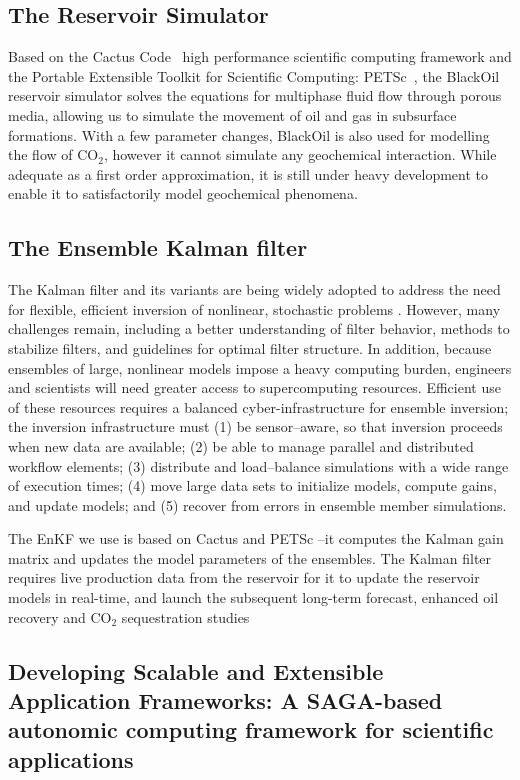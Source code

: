 \documentclass{acm_proc_article-sp}
\begin{document}
\subsection{The Reservoir Simulator} 

Based on the Cactus Code~\cite{cactus_web} high performance
scientific computing framework and the Portable Extensible Toolkit for
Scientific Computing: PETSc~\cite{PETSc}, the BlackOil reservoir
simulator solves the equations for multiphase fluid flow through
porous media, allowing us to simulate the movement of oil and gas in
subsurface formations. With a few parameter changes, BlackOil is also
used for modelling the flow of CO$_2$, however it cannot simulate any
geochemical interaction. While adequate as a first order
approximation, it is still under heavy development to enable it to
satisfactorily model geochemical phenomena.

\subsection{The Ensemble Kalman filter} 

The Kalman filter and its variants are being widely adopted to address
the need for flexible, efficient inversion of nonlinear, stochastic
problems \cite{DataAssim}. However, many challenges remain,
including a better understanding of filter behavior, methods to
stabilize filters, and guidelines for optimal filter structure. In
addition, because ensembles of large, nonlinear models impose a heavy
computing burden, engineers and scientists will need greater access to
supercomputing resources. Efficient use of these resources requires a
balanced cyber-infrastructure for ensemble inversion; the inversion
infrastructure must (1) be sensor--aware, so that inversion proceeds
when new data are available; (2) be able to manage parallel and
distributed workflow elements; (3) distribute and load--balance
simulations with a wide range of execution times; (4) move large data
sets to initialize models, compute gains, and update models; and (5)
recover from errors in ensemble member simulations.

The EnKF we use is based on Cactus and PETSc --it computes the Kalman
gain matrix and updates the model parameters of the ensembles. The
Kalman filter requires live production data from the reservoir for it
to update the reservoir models in real-time, and launch the subsequent
long-term forecast, enhanced oil recovery and CO$_2$ sequestration
studies

\subsection{Developing Scalable and Extensible Application
  Frameworks: A SAGA-based autonomic computing framework for
  scientific applications}
\end{document}
